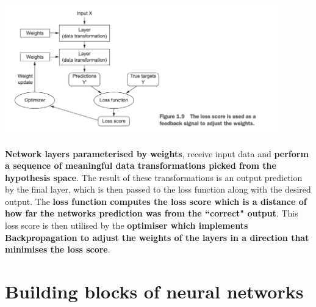 \documentclass[12pt, a4paper]{article}
\begin{document}
\begin{enumerate}
   {
      \centering
      \includegraphics[width=12cm]{training_loop_dnn.png}

   }

   \textbf{Network layers parameterised by weights}, receive input data and \textbf{perform a sequence of
   meaningful data transformations picked from the hypothesis space}. The result of these transformations
   is an output prediction by the final layer, which is then passed to the loss function along with the
   desired output. The \textbf{loss function computes the loss score which is a distance of how far the networks prediction
   was from the ``correct" output}. This loss score is then utilised by the \textbf{optimiser which implements
   Backpropagation to adjust the weights of the layers in a direction that minimises the loss score}.

\end{enumerate}


\section{Building blocks of neural networks}
\end{document}
